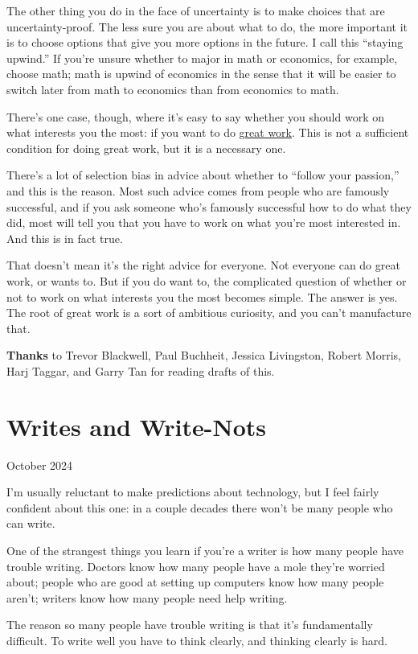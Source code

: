 \documentclass[12pt]{book}
\begin{document}
The other thing you do in the face of uncertainty is to make choices
that are uncertainty-proof. The less sure you are about what to do, the
more important it is to choose options that give you more options in the
future. I call this ``staying upwind.'' If you're unsure whether to
major in math or economics, for example, choose math; math is upwind of
economics in the sense that it will be easier to switch later from math
to economics than from economics to math.

There's one case, though, where it's easy to say whether you should work
on what interests you the most: if you want to do
\href{greatwork.html}{great work}. This is not a sufficient condition
for doing great work, but it is a necessary one.

There's a lot of selection bias in advice about whether to ``follow your
passion,'' and this is the reason. Most such advice comes from people
who are famously successful, and if you ask someone who's famously
successful how to do what they did, most will tell you that you have to
work on what you're most interested in. And this is in fact true.

That doesn't mean it's the right advice for everyone. Not everyone can
do great work, or wants to. But if you do want to, the complicated
question of whether or not to work on what interests you the most
becomes simple. The answer is yes. The root of great work is a sort of
ambitious curiosity, and you can't manufacture that.


\textbf{Thanks} to Trevor Blackwell, Paul Buchheit, Jessica Livingston,
Robert Morris, Harj Taggar, and Garry Tan for reading drafts of this.
\chapter{Writes and Write-Nots}

October 2024

I'm usually reluctant to make predictions about technology, but I feel
fairly confident about this one: in a couple decades there won't be many
people who can write.

One of the strangest things you learn if you're a writer is how many
people have trouble writing. Doctors know how many people have a mole
they're worried about; people who are good at setting up computers know
how many people aren't; writers know how many people need help writing.

The reason so many people have trouble writing is that it's
fundamentally difficult. To write well you have to think clearly, and
thinking clearly is hard.
\end{document}
